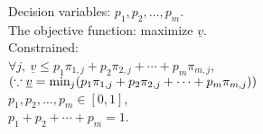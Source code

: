 \begin{pr}$ $\\
Decision variables: $p_1, p_2, \dots, p_m$.\\
The objective function: maximize $\underline{v}$.\\
Constrained:\\
$\forall j,\ \underline{v}\leq p_1\pi_{1, j}+p_2\pi_{2, j}+\cdots+p_m\pi_{m, j}$, $(\because\underline{v}=\min_{j}(p_1\pi_{1, j}+p_2\pi_{2, j}+\cdots+p_m\pi_{m, j}))$\\
$p_1, p_2, \dots, p_m\in[0, 1]$,\\
$p_1+p_2+\cdots+p_m=1$.
\end{pr}
